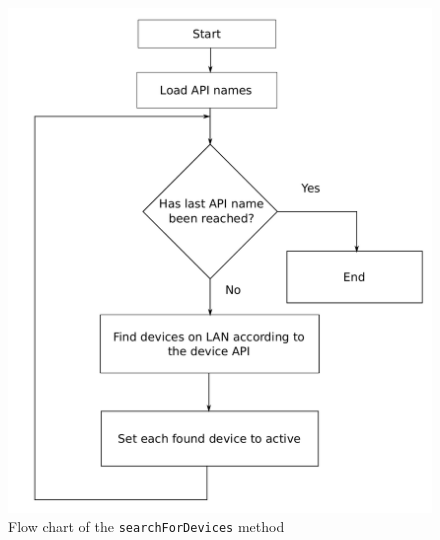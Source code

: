 \documentclass[letterpaper,12pt]{article}   %
\begin{document}
\begin{figure}[H]
    \centering
    \includegraphics[scale=0.45]{figs/searchForDevicesFlow.pdf}
    \caption{Flow chart of the \texttt{searchForDevices} method}
    \label{fig:searchfordevices}
\end{figure}
\end{document}
